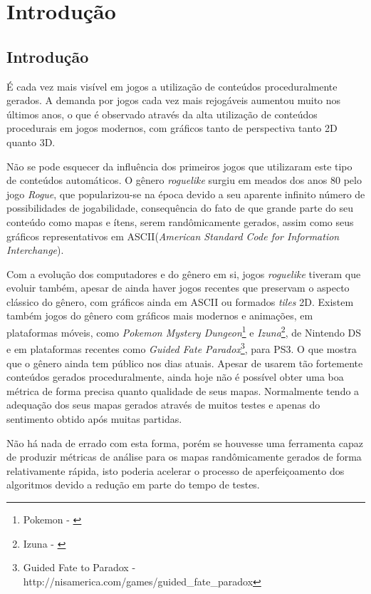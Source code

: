 \chapter*[Introdução]{Introdução}


\section*{Introdução}

É cada vez mais visível em jogos a utilização de conteúdos proceduralmente gerados. A demanda por jogos cada vez mais rejogáveis aumentou muito nos últimos anos, o que é observado através da alta utilização de conteúdos procedurais em jogos modernos, com gráficos tanto de perspectiva tanto 2D quanto 3D.

Não se pode esquecer da influência dos primeiros jogos que utilizaram este tipo de conteúdos automáticos. O gênero \textit{roguelike} surgiu em meados dos anos 80 pelo jogo \textit{Rogue}, que popularizou-se na época devido a seu aparente infinito número de possibilidades de jogabilidade, consequência do fato de que grande parte do seu conteúdo como mapas e ítens, serem randômicamente gerados, assim como seus gráficos representativos em ASCII(\textit{American Standard Code for Information Interchange}).

Com a evolução dos computadores e do gênero em si, jogos  \textit{roguelike} tiveram que evoluir também, apesar de ainda haver jogos recentes que preservam o aspecto clássico do gênero, com gráficos ainda em ASCII ou formados \textit{tiles} 2D. Existem também jogos do gênero com gráficos mais modernos e animações, em plataformas móveis, como \textit{Pokemon Mystery Dungeon}\footnote{Pokemon - \cite{chunsoft}} e \textit{Izuna}\footnote{Izuna - \cite{izuna}}, de Nintendo DS e em plataformas recentes como \textit{Guided Fate Paradox}\footnote{Guided Fate to Paradox - http://nisamerica.com/games/guided\_fate\_paradox}, para PS3. O que mostra que o gênero ainda tem público nos dias atuais.
Apesar de usarem tão fortemente conteúdos gerados proceduralmente, ainda hoje não é possível obter uma boa métrica de forma precisa quanto qualidade de seus mapas. Normalmente tendo a adequação dos seus mapas gerados através de muitos testes e apenas do sentimento obtido após muitas partidas.
 
 Não há nada de errado com esta forma, porém se houvesse uma ferramenta capaz de produzir métricas de análise para os mapas randômicamente gerados de forma relativamente rápida, isto poderia acelerar o processo de aperfeiçoamento dos algoritmos devido a redução em parte do tempo de testes. 
 
